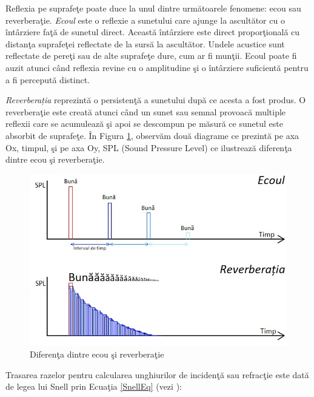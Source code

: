 	
	Reflexia pe suprafe\c{t}e poate duce la unul dintre urm\u{a}toarele fenomene: ecou sau reverbera\c{t}ie. {\it{Ecoul}} este o reflexie a sunetului care ajunge la ascult\u{a}tor cu o \^{i}nt\^{a}rziere fa\c{t}\u{a} de sunetul direct. Aceast\u{a} \^{i}nt\^{a}rziere este direct propor\c{t}ional\u{a} cu distan\c{t}a suprafe\c{t}ei reflectate de la surs\u{a} la ascult\u{a}tor. Undele acustice sunt reflectate de pere\c{t}i sau de alte suprafe\c{t}e dure, cum ar fi mun\c{t}ii. Ecoul poate fi auzit atunci c\^{a}nd reflexia revine cu o amplitudine \c{s}i o \^{i}nt\^{a}rziere suficient\u{a} pentru a fi perceput\u{a} distinct. 
	 
	
	{\it{Reverberația}} reprezint\u{a} o persisten\c{t}\u{a} a sunetului dup\u{a} ce acesta a fost produs. O reverbera\c{t}ie este creat\u{a} atunci c\^{a}nd un sunet sau semnal provoac\u{a} multiple reflexii care se acumuleaz\u{a} \c{s}i apoi se descompun pe m\u{a}sur\u{a} ce sunetul este absorbit de suprafe\c{t}e. \^{I}n Figura \ref{Fig2}, observ\u{a}m dou\u{a} diagrame ce prezintă pe axa Ox, timpul, \c{s}i pe axa Oy, SPL (Sound Pressure Level) ce ilustreaz\u{a} diferen\c{t}a dintre ecou \c{s}i reverbera\c{t}ie. 
	
	\begin{figure}[!htb]
		\centering
		\includegraphics[width=1\linewidth]{imagini/EchoReverberation.jpg}
		\caption{Diferen\c{t}a dintre ecou \c{s}i reverbera\c{t}ie}
		\label{Fig2}
	\end{figure}

	Trasarea razelor pentru calcularea unghiurilor de inciden\c{t}\u{a} sau refrac\c{t}ie este dat\u{a} de legea lui Snell prin Ecua\c{t}ia \eqref{SnellEq} (vezi \cite{snell}):
	

